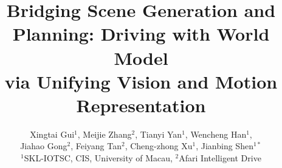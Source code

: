 \documentclass[10pt,twocolumn,letterpaper]{article}
\title{Bridging Scene Generation and Planning: Driving with World Model \\ via Unifying Vision and Motion Representation}
\author{Xingtai Gui$^1$,  Meijie Zhang$^2$,  Tianyi Yan$^1$, Wencheng Han$^1$, \\
Jiahao Gong$^2$, Feiyang Tan$^2$,  Cheng-zhong Xu$^1$, Jianbing Shen$^{1*}$ \\
$^{1}$SKL-IOTSC, CIS, University of Macau, $^{2}$Afari Intelligent Drive
}
\begin{document}
\maketitle
    






{
    \small
    
    
}


\end{document}
